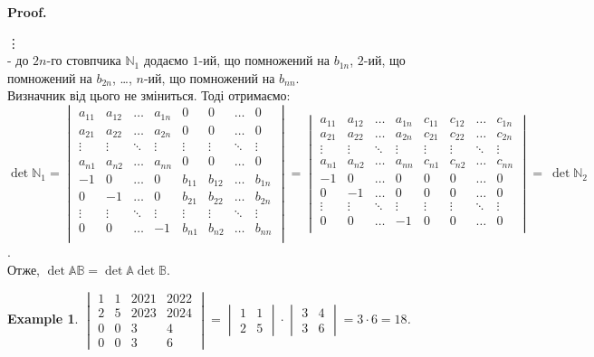 \documentclass[a4paper, 10pt]{article}
\makeatletter
\theoremstyle{theoremdd}
\newtheorem{example}[theorem]{Example}
\renewenvironment{proof}[1][Proof.\\]{\par
\pushQED{\hfill \qed}%
\normalfont \topsep6\p@\@plus6\p@\relax
\trivlist
\item\relax
{\bfseries
#1\@addpunct{.}}\hspace\labelsep\ignorespaces
}{%
\popQED\endtrivlist\@endpefalse
}
\makeatother
\begin{document}
\begin{proof}
\vdots \\
- до $2n$-го стовпчика $\mathbb{N}_1$ додаємо $1$-ий, що помножений на $b_{1n}$, $2$-ий, що помножений на $b_{2n}$, \dots , $n$-ий, що помножений на $b_{nn}$.\\
Визначник від цього не зміниться. Тоді отримаємо:\\
$\det \mathbb{N}_1 = \begin{vmatrix}
a_{11} & a_{12} & \dots & a_{1n} & 0 & 0 & \dots & 0 \\
a_{21} & a_{22} & \dots & a_{2n} & 0 & 0 & \dots & 0 \\
\vdots & \vdots & \ddots & \vdots & \vdots & \vdots & \ddots & \vdots \\
a_{n1} & a_{n2} & \dots & a_{nn} & 0 & 0 & \dots & 0 \\
-1 & 0 & \dots & 0 & b_{11} & b_{12} & \dots & b_{1n} \\
0 & -1 & \dots & 0 & b_{21} & b_{22} & \dots & b_{2n} \\
\vdots & \vdots & \ddots & \vdots & \vdots & \vdots & \ddots & \vdots \\
0 & 0 & \dots & -1 & b_{n1} & b_{n2} & \dots & b_{nn} \\
\end{vmatrix} = \begin{vmatrix}
a_{11} & a_{12} & \dots & a_{1n} & c_{11} & c_{12} & \dots & c_{1n} \\
a_{21} & a_{22} & \dots & a_{2n} & c_{21} & c_{22} & \dots & c_{2n} \\
\vdots & \vdots & \ddots & \vdots & \vdots & \vdots & \ddots & \vdots \\
a_{n1} & a_{n2} & \dots & a_{nn} & c_{n1} & c_{n2} & \dots & c_{nn} \\
-1 & 0 & \dots & 0 & 0 & 0 & \dots & 0 \\
0 & -1 & \dots & 0 & 0 & 0 & \dots & 0 \\
\vdots & \vdots & \ddots & \vdots & \vdots & \vdots & \ddots & \vdots \\
0 & 0 & \dots & -1 & 0 & 0 & \dots & 0 \\
\end{vmatrix} =~ \det \mathbb{N}_2$.\\
Отже, $\det \mathbb{A} \mathbb{B} = \det \mathbb{A} \det \mathbb{B}$.
\end{proof}

\begin{example}
$\begin{vmatrix}
1 & 1 & 2021 & 2022 \\
2 & 5 & 2023 & 2024 \\
0 & 0 & 3 & 4 \\
0 & 0 & 3 & 6
\end{vmatrix} = \begin{vmatrix}
1 & 1 \\
2 & 5
\end{vmatrix} \cdot \begin{vmatrix}
3 & 4 \\
3 & 6
\end{vmatrix} = 3 \cdot 6 = 18$.
\end{example}
\end{document}
